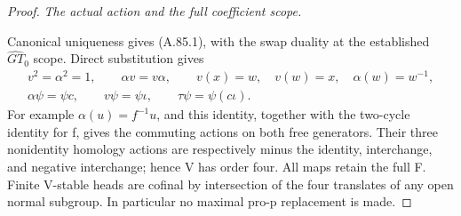 \begin{proof}
\emph{The actual action and the full coefficient scope.}\par
Canonical uniqueness gives (A.85.1), with the swap duality at the
established \(\widehat{GT}_0\) scope. Direct substitution gives
\[
 \begin{gathered}
 v^2=\alpha^2=1,\qquad \alpha v=v\alpha,
 \qquad v(x)=w,\quad v(w)=x,\quad \alpha(w)=w^{-1},\\
 \alpha\psi=\psi c,\qquad v\psi=\psi\iota,
 \qquad\tau\psi=\psi(c\iota).
 \end{gathered}
 \tag{A.85.7}
\]
For example \(\alpha(u)=f^{-1}u\), and this identity, together
with the two-cycle identity for f, gives the commuting actions on
both free generators. Their three nonidentity homology actions are
respectively minus the identity, interchange, and negative interchange;
hence V has order four. All maps retain the full F. Finite V-stable
heads are cofinal by intersection of the four translates of any open
normal subgroup. In particular no maximal pro-p replacement is made.


\end{proof}

